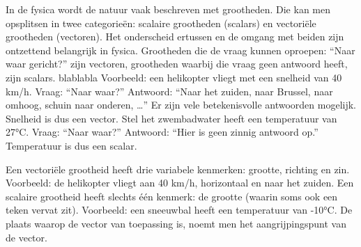 \documentclass{ximera}
\begin{document}
	\author{Bart Lambregs}
    \xmsource\xmuitleg


	In de fysica wordt de natuur vaak beschreven met grootheden. Die kan men opsplitsen in twee categorieën: scalaire grootheden (scalars) en vectoriële grootheden (vectoren). 
	Het onderscheid ertussen en de omgang met beiden zijn ontzettend belangrijk in fysica.
	Grootheden die de vraag kunnen oproepen: “Naar waar gericht?” zijn vectoren, grootheden waarbij die vraag geen antwoord heeft, zijn scalars. 
	blablabla
	Voorbeeld: een helikopter vliegt met een snelheid van 40 km/h. 
	Vraag: “Naar waar?” Antwoord: “Naar het zuiden, naar Brussel, naar omhoog, schuin naar onderen, …” 
	Er zijn vele betekenisvolle antwoorden mogelijk. 
	Snelheid is dus een vector. 
	Stel het zwembadwater heeft een temperatuur van 27°C. 
	Vraag: “Naar waar?” Antwoord: “Hier is geen zinnig antwoord op.” 
	Temperatuur is dus een scalar.

	Een vectoriële grootheid heeft drie variabele kenmerken: grootte, richting en zin. 
	Voorbeeld: de helikopter vliegt aan 40 km/h, horizontaal en naar het zuiden. 
	Een scalaire grootheid heeft slechts één kenmerk: de grootte (waarin soms ook een teken vervat zit). 
	Voorbeeld: een sneeuwbal heeft een temperatuur van -10°C.
	De plaats waarop de vector van toepassing is, noemt men het aangrijpingspunt van de vector.
	

	
\end{document}
